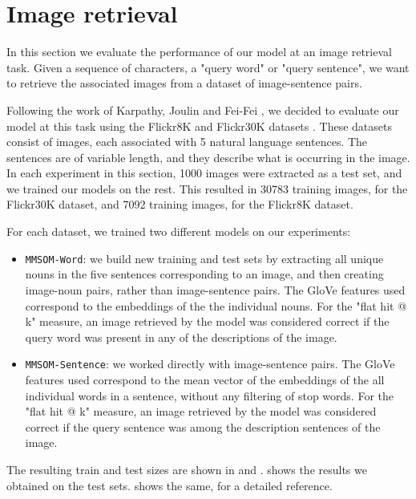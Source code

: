 \documentclass[a4paper]{standalone}
\begin{document}
\section{Image retrieval}\label{sec:ImageRetrieval}

In this section we evaluate the performance of our model at an image retrieval task. Given a sequence of characters, a "query word" or "query sentence", we want to retrieve the associated images from a dataset of image-sentence pairs. 

Following the work of Karpathy, Joulin and Fei-Fei \cite{karpathy2014deep}, we decided to evaluate our model at this task using the Flickr8K\cite{young2014image} and Flickr30K datasets \cite{plummer2015flickr30k}. These datasets consist of images, each associated with 5 natural language sentences. The sentences are of variable length, and they describe what is occurring in the image. In each experiment in this section, 1000 images were extracted as a test set, and we trained our models on the rest. This resulted in 30783 training images, for the Flickr30K dataset, and 7092 training images, for the Flickr8K dataset.

For each dataset, we trained two different models on our experiments:
\begin{itemize}
    \item \texttt{MMSOM-Word}: we build new training and test sets by extracting all unique nouns in the five sentences corresponding to an image, and then creating image-noun pairs, rather than image-sentence pairs. The GloVe features used correspond to the embeddings of the the individual nouns. For the "flat hit @ k" measure, an image retrieved by the model was considered correct if the query word was present in any of the descriptions of the image.
    \item \texttt{MMSOM-Sentence}: we worked directly with image-sentence pairs. The GloVe features used correspond to the mean vector of the embeddings of the all individual words in a sentence, without any filtering of stop words. For the "flat hit @ k" measure, an image retrieved by the model was considered correct if the query sentence was among the description sentences of the image.
\end{itemize}

The resulting train and test sizes are shown in  and .  shows the results we obtained on the test sets.  shows the same, for a detailed reference.
\end{document}
